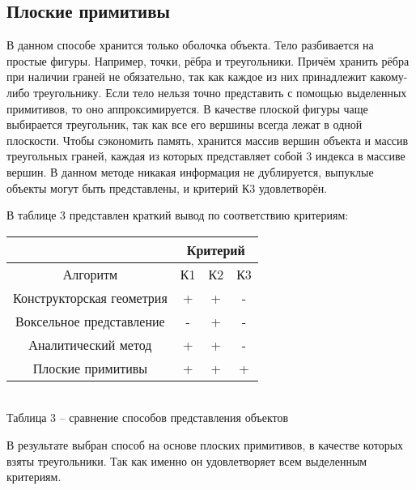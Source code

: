 {    \subsection{Плоские примитивы} {
        В данном способе хранится только оболочка объекта.
        Тело разбивается на простые фигуры.
        Например, точки, рёбра и треугольники.
        Причём хранить рёбра при наличии граней не обязательно, так как
        каждое из них принадлежит какому-либо треугольнику.
        Если тело нельзя точно представить с помощью выделенных примитивов,
        то оно аппроксимируется.
        В качестве плоской фигуры чаще выбирается треугольник, так как все его вершины всегда лежат в одной плоскости.
        Чтобы сэкономить память, хранится массив вершин объекта и массив треугольных граней, каждая из которых представляет собой 3 индекса в массиве вершин.
        В данном методе никакая информация не дублируется, выпуклые объекты могут
        быть представлены, и критерий К3 удовлетворён.
    }

    В таблице 3 представлен краткий вывод по соответствию критериям:
    \begin{center}
        \begin{tabular} { |c|c|c|c| }
            \hline
            \hspace{0pt} & \multicolumn{3}{|c|}{Критерий} \\
            \hline
            Алгоритм & К1 & К2 & К3 \\
            \hline
            Конструкторская геометрия & + & + & - \\
            \hline
            Воксельное представление & - & + & - \\
            \hline
            Аналитический метод & + & + & - \\
            \hline
            Плоские примитивы & + & + & + \\
            \hline
        \end{tabular} \\
        \vspace{2mm}
        \small { Таблица 3 -- сравнение способов представления объектов }
    \end{center}

    В результате выбран способ на основе плоских примитивов, в качестве которых
    взяты треугольники.
    Так как именно он удовлетворяет всем выделенным критериям.
}